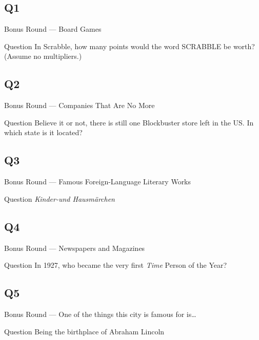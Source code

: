 \documentclass[11pt]{beamer}
\begin{document}
\subsection*{Q1}
\begin{frame}[t]{Bonus Round --- Board Games}
    \vspace{-0.5em}
    \begin{block}{Question}
        In Scrabble, how many points would the word SCRABBLE be worth? (Assume no multipliers.)
    \end{block}
\end{frame}
\subsection*{Q2}
\begin{frame}[t]{Bonus Round --- Companies That Are No More}
    \vspace{-0.5em}
    \begin{block}{Question}
        Believe it or not, there is still one Blockbuster store left in the US. In which state is it located?
    \end{block}
\end{frame}
\subsection*{Q3}
\begin{frame}[t]{Bonus Round --- Famous Foreign-Language Literary Works}
    \vspace{-0.5em}
    \begin{block}{Question}
        \emph{Kinder-und Hausmärchen}
    \end{block}
\end{frame}
\subsection*{Q4}
\begin{frame}[t]{Bonus Round --- Newspapers and Magazines}
    \vspace{-0.5em}
    \begin{block}{Question}
        In 1927, who became the very first \emph{Time} Person of the Year?
    \end{block}
\end{frame}
\subsection*{Q5}
\begin{frame}[t]{Bonus Round --- One of the things this city is famous for is\ldots}
    \vspace{-0.5em}
    \begin{block}{Question}
        Being the birthplace of Abraham Lincoln
    \end{block}
\end{frame}
\end{document}
